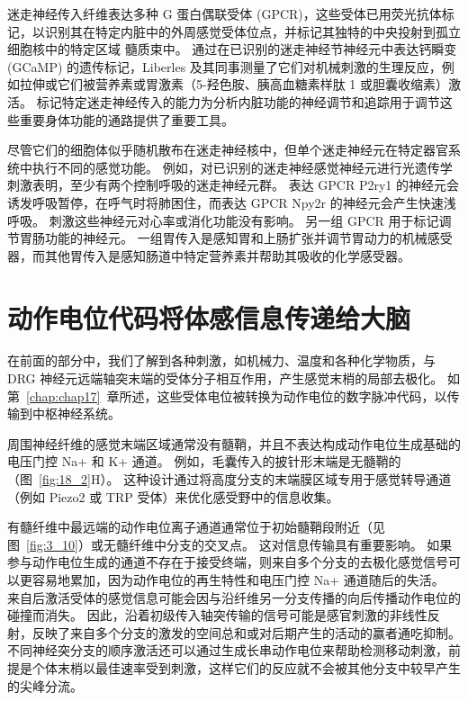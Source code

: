 迷走神经传入纤维表达多种 G 蛋白偶联受体 (GPCR)，这些受体已用荧光抗体标记，以识别其在特定内脏中的外周感觉受体位点，并标记其独特的中央投射到孤立细胞核中的特定区域 髓质束中。
通过在已识别的迷走神经节神经元中表达钙瞬变 (GCaMP) 的遗传标记，Liberles 及其同事测量了它们对机械刺激的生理反应，例如拉伸或它们被营养素或胃激素（5-羟色胺、胰高血糖素样肽 1 或胆囊收缩素）激活。
标记特定迷走神经传入的能力为分析内脏功能的神经调节和追踪用于调节这些重要身体功能的通路提供了重要工具。


尽管它们的细胞体似乎随机散布在迷走神经核中，但单个迷走神经元在特定器官系统中执行不同的感觉功能。
例如，对已识别的迷走神经感觉神经元进行光遗传学刺激表明，至少有两个控制呼吸的迷走神经元群。
表达 GPCR P2ry1 的神经元会诱发呼吸暂停，在呼气时将肺困住，而表达 GPCR Npy2r 的神经元会产生快速浅呼吸。
刺激这些神经元对心率或消化功能没有影响。
另一组 GPCR 用于标记调节胃肠功能的神经元。
一组胃传入是感知胃和上肠扩张并调节胃动力的机械感受器，而其他胃传入是感知肠道中特定营养素并帮助其吸收的化学感受器。



\section{动作电位代码将体感信息传递给大脑}

在前面的部分中，我们了解到各种刺激，如机械力、温度和各种化学物质，与 DRG 神经元远端轴突末端的受体分子相互作用，产生感觉末梢的局部去极化。
如第~\ref{chap:chap17}~章所述，这些受体电位被转换为动作电位的数字脉冲代码，以传输到中枢神经系统。


周围神经纤维的感觉末端区域通常没有髓鞘，并且不表达构成动作电位生成基础的电压门控 Na+ 和 K+ 通道。
例如，毛囊传入的披针形末端是无髓鞘的（图~\ref{fig:18_2}H）。
这种设计通过将高度分支的末端膜区域专用于感觉转导通道（例如 Piezo2 或 TRP 受体）来优化感受野中的信息收集。


有髓纤维中最远端的动作电位离子通道通常位于初始髓鞘段附近（见图~\ref{fig:3_10}）或无髓纤维中分支的交叉点。
这对信息传输具有重要影响。
如果参与动作电位生成的通道不存在于接受终端，则来自多个分支的去极化感觉信号可以更容易地累加，因为动作电位的再生特性和电压门控 Na+ 通道随后的失活。
来自后激活受体的感觉信息可能会因与沿纤维另一分支传播的向后传播动作电位的碰撞而消失。
因此，沿着初级传入轴突传输的信号可能是感官刺激的非线性反射，反映了来自多个分支的激发的空间总和或对后期产生的活动的赢者通吃抑制。
不同神经突分支的顺序激活还可以通过生成长串动作电位来帮助检测移动刺激，前提是个体末梢以最佳速率受到刺激，这样它们的反应就不会被其他分支中较早产生的尖峰分流。


